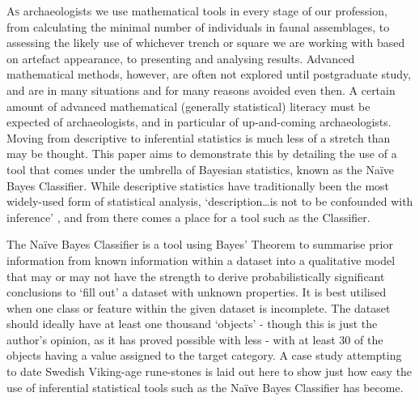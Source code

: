 \lettrine[lines=3,slope=4pt,findent=-3pt]{A}{s} archaeologists we use mathematical tools in every stage of our profession, from calculating the minimal number of individuals in faunal assemblages, to assessing the likely use of whichever trench or square we are working with based on artefact appearance, to presenting and analysing results. Advanced mathematical methods, however, are often not explored until postgraduate study, and are in many situations and for many reasons avoided even then. A certain amount of advanced mathematical (generally statistical) literacy must be expected of archaeologists, and in particular of up-and-coming archaeologists. Moving from descriptive to inferential statistics is much less of a stretch than may be thought. This paper aims to demonstrate this by detailing the use of a tool that comes under the umbrella of Bayesian statistics, known as the Naïve Bayes Classifier. While descriptive statistics have traditionally been the most widely-used form of statistical analysis, ‘description…is not to be confounded with inference’ \parencite[5]{Buck_1996}, and from there comes a place for a tool such as the Classifier. 

	The Naïve Bayes Classifier is a tool using Bayes’ Theorem to summarise prior information from known information within a dataset into a qualitative model that may or may not have the strength to derive probabilistically significant conclusions to ‘fill out’ a dataset with unknown properties. It is best utilised when one class or feature within the given dataset is incomplete. The dataset should ideally have at least one thousand ‘objects’ - though this is just the author’s opinion, as it has proved possible with less - with at least 30 of the objects having a value assigned to the target category. A case study attempting to date Swedish Viking-age rune-stones is laid out here to show just how easy the use of inferential statistical tools such as the Naïve Bayes Classifier has become. 

	

